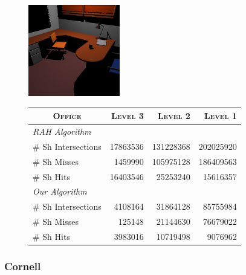\begin{figure}[!htb]
    \begin{minipage}{0.25\linewidth}
        \centering
        \includegraphics[width=4.0cm]{Images/Office_Preview}
    \end{minipage}
    \begin{minipage}{0.725\linewidth}
        \centering
        \fontsize{8}{10}
        \selectfont
        \begin{tabular}[h]{l|rrr}
            \multicolumn{1}{c|}{\textsc{Office}} & \textsc{Level 3} & \textsc{Level 2} & \textsc{Level 1}\\
            \hline
            \emph{RAH Algorithm} & & \\
            \hline
            \quad \# Sh Intersections  & 17863536	& 131228368	& 202025920	\\
            \quad \# Sh Misses            & 1459990	& 105975128	& 186409563	\\
            \quad \# Sh Hits              & 16403546	& 25253240	& 15616357	\\
            \hline
            \emph{Our Algorithm} & & \\
            \hline
            \quad \# Sh Intersections  & 4108164    & 31864128	& 85755984	\\
            \quad \# Sh Misses         & 125148		& 21144630	& 76679022	\\
            \quad \# Sh Hits           & 3983016	& 10719498	& 9076962	\\
        \end{tabular}
        \label{table:office-d8-n3-results}
    \end{minipage}
\end{figure}

\subsubsection{Cornell}

